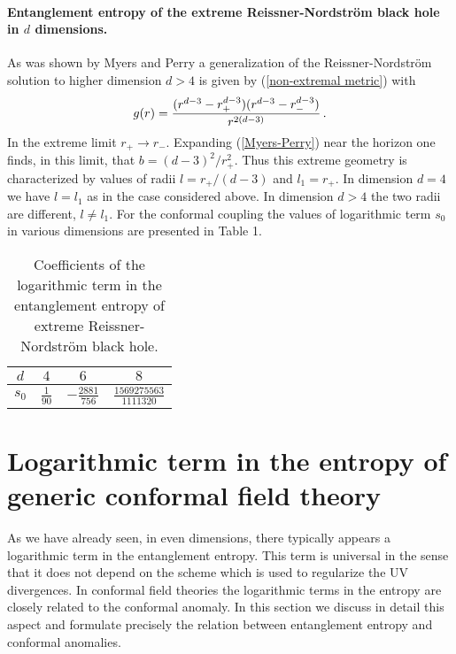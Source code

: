 \documentclass[12pt]{article}
\def\be{\begin{eqnarray}}
\def\ee{\end{eqnarray}}
\def\lb{\label}
\def\o{\over}
\begin{document}
\paragraph*{Entanglement entropy of the extreme Reissner-Nordstr\"{o}m black hole in $d$ dimensions.}
As was shown by Myers and Perry  \cite{Myers:1986un} a generalization of the Reissner-Nordstr\"{o}m solution to higher dimension $d>4$ is given by  (\ref{non-extremal metric}) with
\be
g(r)= {(r^{d-3}-r_+^{d-3})(r^{d-3}-r_-^{d-3})\o r^{2(d-3)}}\, .
\lb{Myers-Perry}
\ee
In the extreme limit $r_+\rightarrow r_-$.  Expanding (\ref{Myers-Perry}) near the horizon one finds, in this limit, that $b={(d-3)^2/r_+^2}$. Thus this extreme geometry is characterized by
values  of radii $l=r_+/(d-3)$ and $l_1=r_+$. In dimension $d=4$ we have $l=l_1$ as in the case considered above. In dimension $d>4$ the two radii are different, $l\neq l_1$.
For the conformal coupling  the values of logarithmic term $s_0$ in various dimensions are presented in Table 1.

\begin{table}[t]
\renewcommand{\arraystretch}{1.5}
\centering
\begin{tabular}{|c|ccc|} 
\hline
  $d$& $4$& $6$& $8$  \\
\hline
 $s_0$ &  $\frac{1}{90}$& $-\frac{2881}{756}$ & $\frac{1569275563}{1111320}$  \\[0.5ex]
 \hline  
\end{tabular} \caption{Coefficients of the logarithmic term in the entanglement entropy of extreme Reissner-Nordstr\"{o}m black hole.}
\end{table}



                          
\section{ Logarithmic term in the entropy of generic conformal field theory}

As we have already seen,  in even dimensions, there typically appears a logarithmic term in the entanglement entropy. This term is  universal
in the sense that it  does not depend on the  scheme which is used to regularize the UV divergences. In conformal field theories the
logarithmic terms in the entropy are closely related to the conformal anomaly. In this section we discuss in detail this aspect and formulate precisely
the relation between entanglement entropy and conformal anomalies.
\end{document}
